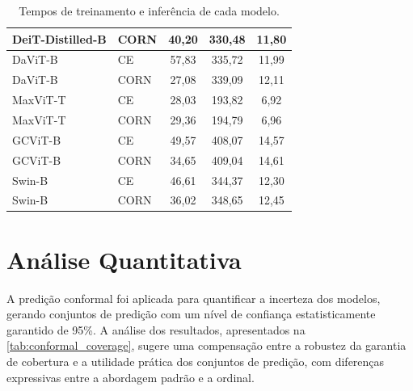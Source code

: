 \begin{table}
\begin{tabular}{|l|l|c|c|c|}
        \hline
        DeiT-Distilled-B & CORN & 40,20 & 330,48 & 11,80 \\
        \hline
        DaViT-B & CE & 57,83 & 335,72 & 11,99 \\
        \hline
        DaViT-B & CORN & 27,08 & 339,09 & 12,11 \\
        \hline
        MaxViT-T & CE & 28,03 & 193,82 & 6,92 \\
        \hline
        MaxViT-T & CORN & 29,36 & 194,79 & 6,96 \\
        \hline
        GCViT-B & CE & 49,57 & 408,07 & 14,57 \\
        \hline
        GCViT-B & CORN & 34,65 & 409,04 & 14,61 \\
        \hline
        Swin-B & CE & 46,61 & 344,37 & 12,30 \\
        \hline
        Swin-B & CORN & 36,02 & 348,65 & 12,45 \\
        \hline
    \end{tabular}
    \caption{Tempos de treinamento e inferência de cada modelo.}
    \label{tab:computational_performance}
\end{table}

\section{Análise Quantitativa}

A predição conformal foi aplicada para quantificar a incerteza dos modelos, gerando conjuntos de predição com um nível de confiança estatisticamente garantido de 95\%. A análise dos resultados, apresentados na \autoref{tab:conformal_coverage}, sugere uma compensação entre a robustez da garantia de cobertura e a utilidade prática dos conjuntos de predição, com diferenças expressivas entre a abordagem padrão e a ordinal.


